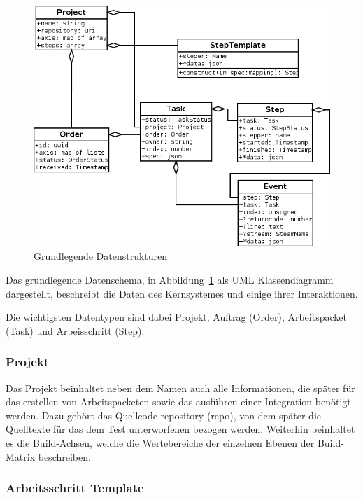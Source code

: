 \begin{figure}[ht] 
  \centering
  \label{fig:datenstrukturen}
  \includegraphics[width=\textwidth]{imageinput/datenstrukturen-step-templates.png}
  \caption{Grundlegende Datenstrukturen}
\end{figure}

Das grundlegende Datenschema, in Abbildung~\ref{fig:datenstrukturen} als UML Klassendiagramm dargestellt,
beschreibt die Daten des Kernsystemes und einige ihrer Interaktionen.

Die wichtigsten Datentypen sind dabei Projekt, Auftrag (Order), Arbeitspacket (Task) und Arbeisschritt (Step).

\subsubsection{Projekt}

Das Projekt beinhaltet neben dem Namen auch alle Informationen,
die sp\"ater f\"ur das erstellen von Arbeitspacketen sowie
das ausf\"uhren einer Integration ben\"otigt werden.
Dazu geh\"ort das Quellcode-repository (repo), von dem sp\"ater
die Quelltexte f\"ur das dem Test unterworfenen bezogen werden.
Weiterhin beinhaltet es die Build-Achsen,
welche die Wertebereiche der einzelnen Ebenen der Build-Matrix
beschreiben.

\subsubsection{Arbeitsschritt Template}

